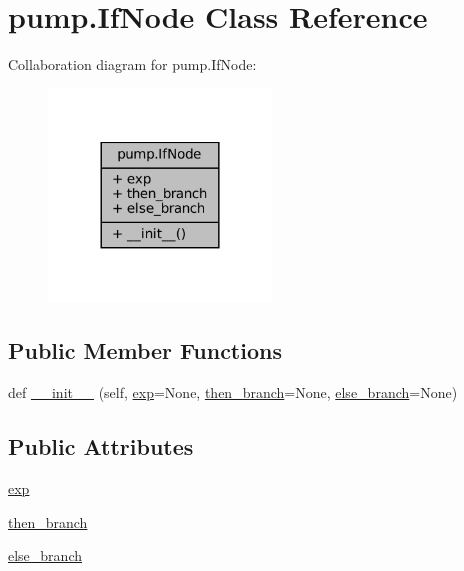 \hypertarget{classpump_1_1IfNode}{}\section{pump.\+If\+Node Class Reference}
\label{classpump_1_1IfNode}


Collaboration diagram for pump.\+If\+Node\+:
\nopagebreak
\begin{figure}[H]
\begin{center}
\leavevmode
\includegraphics[width=168pt]{classpump_1_1IfNode__coll__graph}
\end{center}
\end{figure}
\subsection*{Public Member Functions}
\begin{DoxyCompactItemize}
\item 
def \hyperlink{classpump_1_1IfNode_ab8bff21c18d60b461f7b6fa9dfa59f7c}{\+\_\+\+\_\+init\+\_\+\+\_\+} (self, \hyperlink{classpump_1_1IfNode_a92042e4262196ffd7366350539f512d8}{exp}=None, \hyperlink{classpump_1_1IfNode_aa9e2e488564629f8dc0d64d165a19ffa}{then\+\_\+branch}=None, \hyperlink{classpump_1_1IfNode_a12e422b16ed4291f15cd95cd6e7f81eb}{else\+\_\+branch}=None)
\end{DoxyCompactItemize}
\subsection*{Public Attributes}
\begin{DoxyCompactItemize}
\item 
\hyperlink{classpump_1_1IfNode_a92042e4262196ffd7366350539f512d8}{exp}
\item 
\hyperlink{classpump_1_1IfNode_aa9e2e488564629f8dc0d64d165a19ffa}{then\+\_\+branch}
\item 
\hyperlink{classpump_1_1IfNode_a12e422b16ed4291f15cd95cd6e7f81eb}{else\+\_\+branch}
\end{DoxyCompactItemize}


